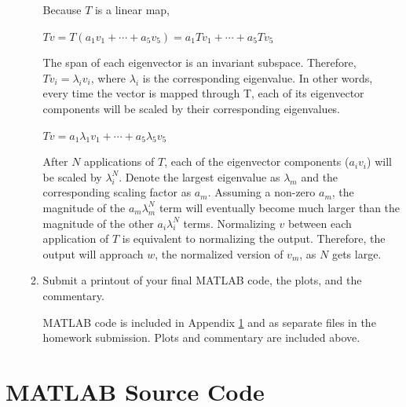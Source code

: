 \documentclass[fleqn]{article}
\begin{document}
\begin{enumerate}[nolistsep]
\begin{enumerate}
					Because $T$ is a linear map,
					
					$Tv = T(a_1v_1 + \cdots + a_5v_5) = a_1Tv_1 + \cdots + a_5Tv_5$
					
					The span of each eigenvector is an invariant subspace. Therefore, $Tv_i = \lambda_i v_i$, where $\lambda_i$ is the corresponding eigenvalue. In other words, every time the vector is mapped through T, each of its eigenvector components will be scaled by their corresponding eigenvalues.
					
					$Tv = a_1\lambda_1v_1 + \cdots + a_5\lambda_5v_5$
					
					After $N$ applications of $T$, each of the eigenvector components ($a_iv_i$) will be scaled by $\lambda_i^N$. Denote the largest eigenvalue as $\lambda_m$ and the corresponding scaling factor as $a_m$.  Assuming a non-zero $a_m$, the magnitude of the $a_m\lambda_m^N$ term will eventually become much larger than the magnitude of the other $a_i\lambda_i^N$ terms. Normalizing $v$ between each application of $T$ is equivalent to normalizing the output. Therefore, the output will approach $w$, the normalized version of $v_m$, as $N$ gets large.
					
					
				\item Submit a printout of your final MATLAB code, the plots, and the commentary.
				
				MATLAB code is included in Appendix \ref{matlab_code} and as separate files in the homework submission. Plots and commentary are included above.
			\end{enumerate}
	\end{enumerate}
	
	\pagebreak
	\appendix
	\section{MATLAB Source Code}
	\label{matlab_code}
	\lstset{style=Matlab-editor,basicstyle=\ttfamily\footnotesize}
	
	\raggedbottom
\end{document}
